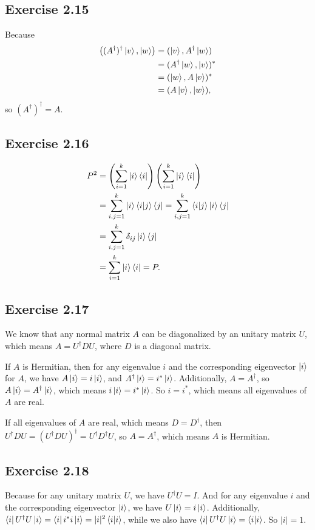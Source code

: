\subsection*{Exercise 2.15}
Because
\begin{align}
\left((A^\dagger)^\dagger\ket{v},|w\rangle\right)
&=(\ket{v},A^\dagger \ket{w}) \\
&=(A^\dagger\ket{w},\ket{v})^*\\
&=(\ket{w},A\ket{v})^*\\
&=(A\ket{v},\ket{w}),
 \end{align}
so $(A^\dagger)^\dagger = A$.

\subsection*{Exercise 2.16}
\begin{align}
P^2&=\left(\sum_{i=1}^{k}\ket{i}\bra{i}\right)\left(\sum_{i=1}^{k}\ket{i}\bra{i}\right)\\
&=\sum_{i,j=1}^k \ket{i}\bra{i}\ket{j}\bra{j}=\sum_{i,j=1}^k \bra{i}\ket{j}\ket{i}\bra{j}\\
&=\sum_{i,j=1}^k\delta_{ij}\ket{i}\bra{j}\\
&=\sum_{i=1}^k\ket{i}\bra{i}=P.
 \end{align}

\subsection*{Exercise 2.17}
We know that any normal matrix $A$ can be diagonalized by an unitary matrix $U$, which means $A=U^\dagger DU$, where $D$ is a diagonal matrix.

If $A$ is Hermitian, then for any eigenvalue $i$ and the corresponding eigenvector $\ket{i}$ for $A$, we have $A\ket{i}=i\ket{i}$, and $A^{\dagger}\ket{i} = i^* \ket{i}$. Additionally, $A=A^\dagger$, so $A\ket{i}=A^\dagger \ket{i}$, which means $i\ket{i}=i^*\ket{i}$. So $i=i^*$, which means all eigenvalues of $A$ are real.

If all eigenvalues of $A$ are real, which means $D=D^\dagger$, then $U^\dagger DU=(U^\dagger DU)^\dagger = U^\dagger D^\dagger U$, so $A=A^\dagger$, which means $A$ is Hermitian. 

\subsection*{Exercise 2.18}
 Because for any unitary matrix $U$, we have $U^\dagger U = I$. And for any eigenvalue $i$ and the corresponding eigenvector $\ket{i}$, we have $U\ket{i}=i\ket{i}$. Additionally, $\bra{i}U^\dagger U\ket{i}=\bra{i}i^* i\ket{i}=|i|^2\bra{i}\ket{i}$, while we also have $\bra{i}U^\dagger U\ket{i}=\bra{i}\ket{i}$. So $|i| = 1$.

